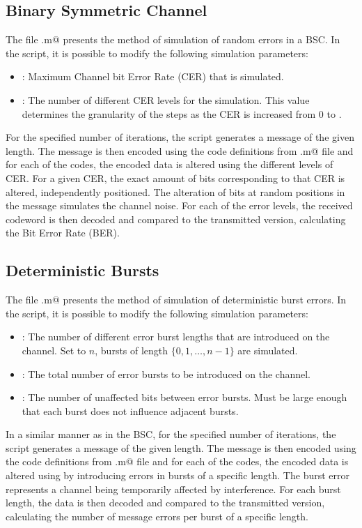 \subsection{Binary Symmetric Channel}
The file \verb@randomErrors.m@ presents the method of simulation of random errors in a BSC. In the script, it is possible to modify the following simulation parameters:
\begin{itemize}\setlength\itemsep{0pt}
   \item \verb@maxCER@: Maximum Channel bit Error Rate (CER) that is simulated.
   \item \verb@CERLevels@: The number of different CER levels for the simulation. This value determines the granularity of the steps as the CER is increased from $0$ to \verb@maxCER@.
\end{itemize}
For the specified number of iterations, the script generates a message of the given length. The message is then encoded using the code definitions from \verb@trellisGenerator.m@ file and for each of the codes, the encoded data is altered using the different levels of CER. For a given CER, the exact amount of bits corresponding to that CER is altered, independently positioned. The alteration of bits at random positions in the message simulates the channel noise. For each of the error levels, the received codeword is then decoded and compared to the transmitted version, calculating the Bit Error Rate (BER).

\subsection{Deterministic Bursts}

The file \verb@burstErrors.m@ presents the method of simulation of deterministic burst errors. In the script, it is possible to modify the following simulation parameters:
\begin{itemize}\setlength\itemsep{0pt}
   \item \verb@BurstLevels@: The number of different error burst lengths that are introduced on the channel. Set to $n$, bursts of length $\{0, 1, \dots , n-1 \}$ are simulated.
   \item \verb@nBursts@: The total number of error bursts to be introduced on the channel.
   \item \verb@burstSep@: The number of unaffected bits between error bursts. Must be large enough that each burst does not influence adjacent bursts.
\end{itemize}
In a similar manner as in the BSC, for the specified number of iterations, the script generates a message of the given length. The message is then encoded using the code definitions from \verb@trellisGenerator.m@ file and for each of the codes, the encoded data is altered using by introducing errors in bursts of a specific length. The burst error represents a channel being temporarily affected by interference. For each burst length, the data is then decoded and compared to the transmitted version, calculating the number of message errors per burst of a specific length.


